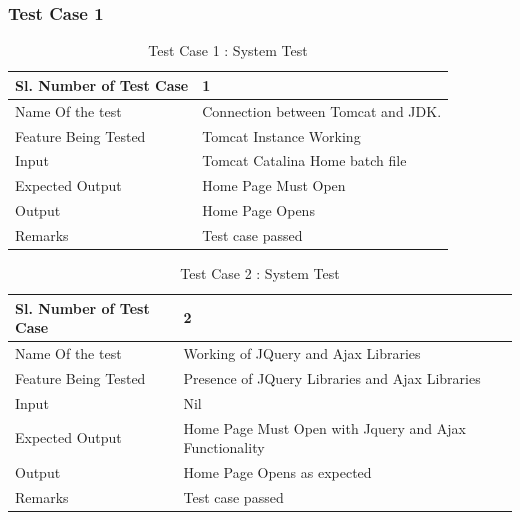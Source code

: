 \documentclass[12pt]{report}
\begin{document}
\subsubsection{Test Case 1}
\begin{table}
    \begin{tabular}{|l|l|}
    \hline
    Sl. Number of Test Case & 1                                  \\ \hline
    Name Of the test        & Connection between Tomcat and JDK. \\ \hline
    Feature Being Tested    & Tomcat Instance Working            \\ \hline
    Input                   & Tomcat Catalina Home batch file    \\ \hline
    Expected Output         & Home Page Must Open                \\ \hline
    Output                  & Home Page Opens                    \\ \hline
    Remarks                 & Test case passed                   \\ \hline
    \end{tabular}
    \caption {Test Case 1 : System Test}
\end{table}



\begin{table}
    \begin{tabular}{|l|l|}
    \hline
    Sl. Number of Test Case & 2                                                      \\ \hline
    Name Of the test        & Working of JQuery and Ajax Libraries                   \\ \hline
    Feature Being Tested    & Presence of JQuery Libraries and Ajax Libraries        \\ \hline
    Input                   & Nil                                                    \\ \hline
    Expected Output         & Home Page Must Open with Jquery and Ajax Functionality \\ \hline
    Output                  & Home Page Opens as expected                            \\ \hline
    Remarks                 & Test case passed                                       \\ \hline
    \end{tabular}
    \caption {Test Case 2 : System Test}
\end{table}
\end{document}
